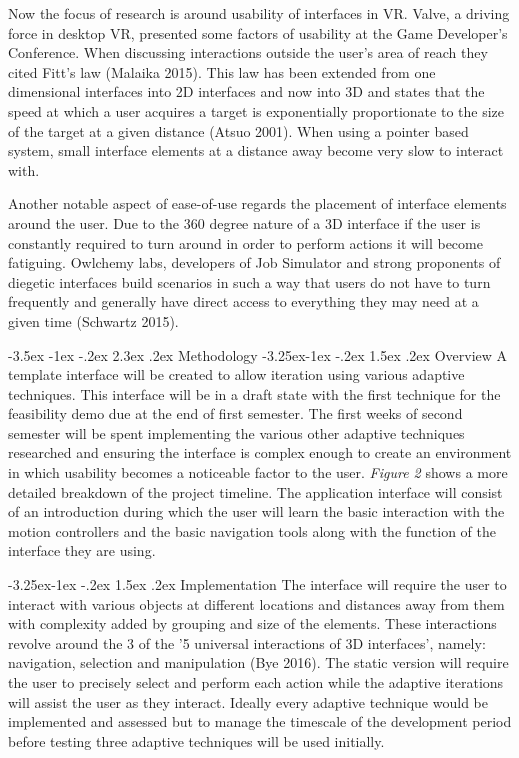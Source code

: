 \documentclass[11pt]{article}
\makeatletter
\renewcommand{\section}{\@startsection {section}{1}{\z@}%
             {-3.5ex \@plus -1ex \@minus -.2ex}%
             {2.3ex \@plus .2ex}%
             {\normalfont\Large\scshape\bfseries}}
\renewcommand{\subsection}{\@startsection{subsection}{2}{\z@}%
             {-3.25ex\@plus -1ex \@minus -.2ex}%
             {1.5ex \@plus .2ex}%
             {\normalfont\large\scshape\bfseries}}
\makeatother
\begin{document}
Now the focus of research is around usability of interfaces in VR. Valve, a driving force in desktop VR, presented some factors of usability at the Game Developer's Conference. When discussing interactions outside the user's area of reach they cited Fitt's law (Malaika 2015). This law has been extended from one dimensional interfaces into 2D interfaces and now into 3D and states that the speed at which a user acquires a target is exponentially proportionate to the size of the target at a given distance (Atsuo 2001). When using a pointer based system, small interface elements at a distance away become very slow to interact with. 

Another notable aspect of ease-of-use regards the placement of interface elements around the user. Due to the 360 degree nature of a 3D interface if the user is constantly required to turn around in order to perform actions it will become fatiguing. Owlchemy labs, developers of Job Simulator and strong proponents of diegetic interfaces build scenarios in such a way that users do not have to turn frequently and generally have direct access to everything they may need at a given time (Schwartz 2015).

\section{Methodology}
\subsection{Overview}
A template interface will be created to allow iteration using various adaptive techniques. This interface will be in a draft state with the first technique for the feasibility demo due at the end of first semester. The first weeks of second semester will be spent implementing the various other adaptive techniques researched and ensuring the interface is complex enough to create an environment in which usability becomes a noticeable factor to the user. \emph{Figure 2} shows a more detailed breakdown of the project timeline. The application interface will consist of an introduction during which the user will learn the basic interaction with the motion controllers and the basic navigation tools along with the function of the interface they are using.

\subsection{Implementation}
The interface will require the user to interact with various objects at different locations and distances away from them with complexity added by grouping and size of the elements. These interactions revolve around the 3 of the '5 universal interactions of 3D interfaces', namely: navigation, selection and manipulation (Bye 2016). The static version will require the user to precisely select and perform each action while the adaptive iterations will assist the user as they interact. Ideally every adaptive technique would be implemented and assessed but to manage the timescale of the development period before testing three adaptive techniques will be used initially.
\end{document}
